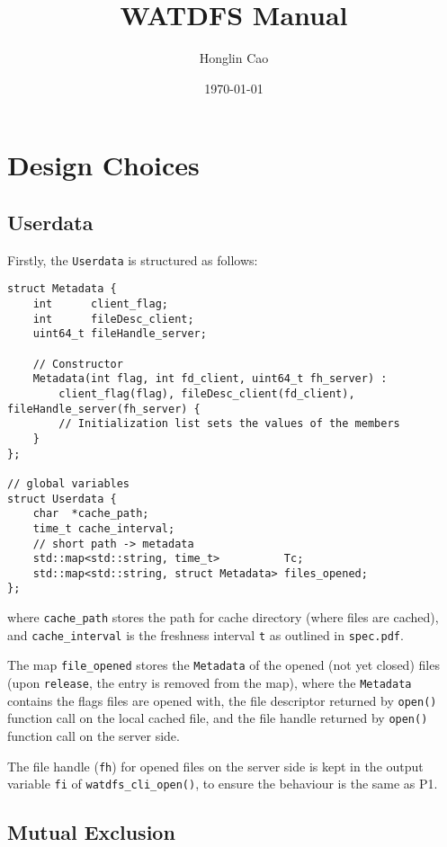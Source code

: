 \documentclass[11pt,a4paper]{article}
\title{WATDFS Manual}
\author{Honglin Cao}
\date{\today}
\begin{document}
\maketitle
\tableofcontents
\newpage


\section{Design Choices}

\subsection{Userdata}

Firstly, the \texttt{Userdata} is structured as follows:
\begin{lstlisting}
struct Metadata {
    int      client_flag;
    int      fileDesc_client;
    uint64_t fileHandle_server;

    // Constructor
    Metadata(int flag, int fd_client, uint64_t fh_server) :
        client_flag(flag), fileDesc_client(fd_client), fileHandle_server(fh_server) {
        // Initialization list sets the values of the members
    }
};

// global variables
struct Userdata {
    char  *cache_path;
    time_t cache_interval;
    // short path -> metadata
    std::map<std::string, time_t>          Tc;
    std::map<std::string, struct Metadata> files_opened;
};
\end{lstlisting}

where \texttt{cache\_path} stores the path for cache directory (where files are cached), and \texttt{cache\_interval} is the freshness interval \texttt{t} as outlined in \texttt{spec.pdf}.

The map \texttt{file\_opened} stores the \texttt{Metadata} of the opened (not yet closed) files (upon \texttt{release}, the entry is removed from the map), where the \texttt{Metadata} contains the flags files are opened with, the file descriptor returned by \texttt{open()} function call on the local cached file, and the file handle returned by \texttt{open()} function call on the server side.

The file handle (\texttt{fh}) for opened files on the server side is kept in the output variable \texttt{fi} of \texttt{watdfs\_cli\_open()}, to ensure the behaviour is the same as P1.

\subsection{Mutual Exclusion}
\end{document}
